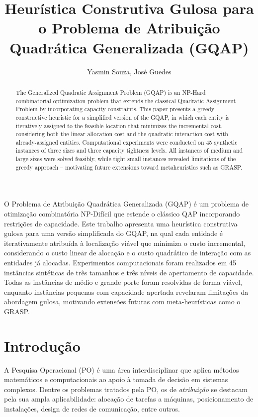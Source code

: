 \documentclass[12pt]{article}
\title{Heurística Construtiva Gulosa para o Problema de Atribuição\\
Quadrática Generalizada (GQAP)}
\author{Yasmin Souza\inst{1}, José Guedes\inst{1}}
\begin{document}
\maketitle

\begin{abstract}
The Generalized Quadratic Assignment Problem (GQAP) is an NP-Hard combinatorial
optimization problem that extends the classical Quadratic Assignment Problem by
incorporating capacity constraints. This paper presents a greedy constructive
heuristic for a simplified version of the GQAP, in which each entity is
iteratively assigned to the feasible location that minimizes the incremental
cost, considering both the linear allocation cost and the quadratic interaction
cost with already-assigned entities. Computational experiments were conducted on
45 synthetic instances of three sizes and three capacity tightness levels. All
instances of medium and large sizes were solved feasibly, while tight small
instances revealed limitations of the greedy approach -- motivating future
extensions toward metaheuristics such as GRASP.
\end{abstract}

\begin{resumo}
O Problema de Atribuição Quadrática Generalizada (GQAP) é um problema de
otimização combinatória NP-Difícil que estende o clássico QAP incorporando
restrições de capacidade. Este trabalho apresenta uma heurística construtiva
gulosa para uma versão simplificada do GQAP, na qual cada entidade é
iterativamente atribuída à localização viável que minimiza o custo incremental,
considerando o custo linear de alocação e o custo quadrático de interação com as
entidades já alocadas. Experimentos computacionais foram realizados em 45
instâncias sintéticas de três tamanhos e três níveis de apertamento de
capacidade. Todas as instâncias de médio e grande porte foram resolvidas de
forma viável, enquanto instâncias pequenas com capacidade apertada revelaram
limitações da abordagem gulosa, motivando extensões futuras com
meta-heurísticas como o GRASP.
\end{resumo}


\section{Introdução}

A Pesquisa Operacional (PO) é uma área interdisciplinar que aplica métodos
matemáticos e computacionais ao apoio à tomada de decisão em sistemas complexos.
Dentre os problemas tratados pela PO, os de \textit{atribuição} se destacam pela
sua ampla aplicabilidade: alocação de tarefas a máquinas, posicionamento de
instalações, design de redes de comunicação, entre outros.
\end{document}
